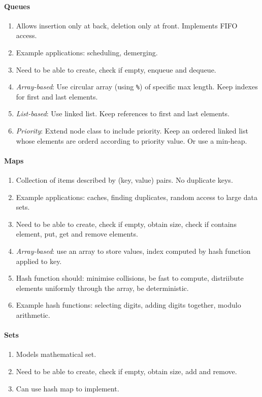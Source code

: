 \documentclass[twocolumn,english]{article}
\begin{document}
\paragraph{Queues}
\begin{enumerate}
\item Allows insertion only at back, deletion only at front. Implements
FIFO access. 
\item Example applications: scheduling, demerging.
\item Need to be able to create, check if empty, enqueue and dequeue.
\item \emph{Array-based}: Use circular array (using \texttt{\%}) of specific
max length. Keep indexes for first and last elements.
\item \emph{List-based}: Use linked list. Keep references to first and last
elements.
\item \emph{Priority}: Extend node class to include priority. Keep an ordered
linked list whose elements are orderd according to priority value.
Or use a min-heap.
\end{enumerate}

\paragraph{Maps}
\begin{enumerate}
\item Collection of items described by (key, value) pairs. No duplicate
keys.
\item Example applications: caches, finding duplicates, random access to
large data sets.
\item Need to be able to create, check if empty, obtain size, check if contains
element, put, get and remove elements.
\item \emph{Array-based}: use an array to store values, index computed by
hash function applied to key.
\item Hash function should: minimise collisions, be fast to compute, distriibute
elements uniformly through the array, be deterministic.
\item Example hash functions: selecting digits, adding digits together,
modulo arithmetic.
\end{enumerate}

\paragraph{Sets}
\begin{enumerate}
\item Models mathematical set.
\item Need to be able to create, check if empty, obtain size, add and remove.
\item Can use hash map to implement.
\end{enumerate}
\end{document}
